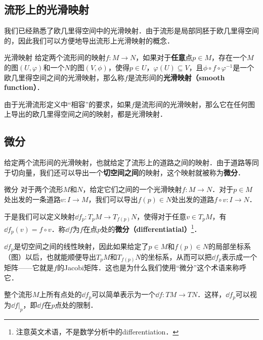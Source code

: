 

\subsection{流形上的光滑映射}

我们已经熟悉了欧几里得空间中的光滑映射．由于流形是局部同胚于欧几里得空间的，因此我们可以方便地导出流形上光滑映射的概念．

\begin{definition}{光滑映射}
给定两个流形间的映射$f:M\to N$，如果对于\textbf{任意}点$p\in M$，存在一个$M$的图$(U, \varphi)$和一个$N$的图$(V, \phi)$，使得$p\in U$，$\varphi(U)\subseteq V$，且$\phi\circ f\circ\varphi^{-1}$是一个欧几里得空间之间的光滑映射，那么称$f$是流形间的\textbf{光滑映射（smooth function）}．
\end{definition}

由于光滑流形定义中“相容”的要求，如果$f$是流形间的光滑映射，那么它在任何图上导出的欧几里得空间之间的映射，都是光滑映射．


\subsection{微分}

给定两个流形间的光滑映射，也就给定了流形上的道路之间的映射．由于道路等同于切向量，我们还可以导出一个\textbf{切空间之间}的映射，这个映射就被称为\textbf{微分}．

\begin{definition}{微分}
对于两个流形$M$和$N$，给定它们之间的一个光滑映射$f:M\to N$．对于$p\in M$处出发的一条道路$v:I\to M$，我们可以导出$f(p)\in N$处出发的道路$f\circ v:I\to N$．

于是我们可以定义映射$\dd f_p: T_pM\to T_{f(p)}N$，使得对于任意$v\in T_pM$，有$\dd f_p(v)=f\circ v$．称$\dd f$为$f$在点$p$处的\textbf{微分（differentiatial）}\footnote{注意英文术语，不是数学分析中的differentiation．}．
\end{definition}

$\dd f_p$是切空间之间的线性映射，因此如果给定了$p\in M$和$f(p)\in N$的局部坐标系（图）以后，也就能顺便导出$T_pM$和$T_{f(p)}N$的坐标系，从而可以把$\dd f_p$表示成一个矩阵——它就是$f$的Jacobi矩阵．这也是为什么我们使用“微分”这个术语来称呼它．

整个流形$M$上所有点处的$\dd f_p$可以简单表示为一个$\dd f:TM\to TN$．这样，$\dd f_p$可以视为$\dd f|_p$，即$\dd f$在$p$点处的限制．

